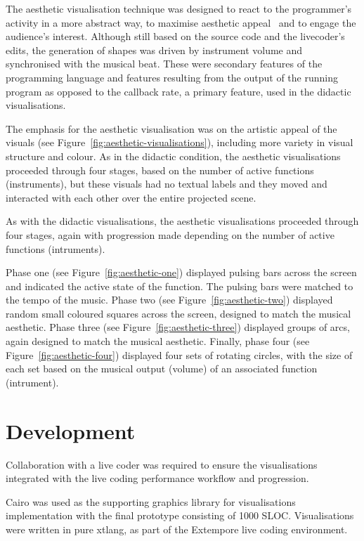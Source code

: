 

The aesthetic visualisation technique was designed to react to the programmer's activity in a more abstract way, to maximise aesthetic appeal~\cite{Cawthon2007} and to engage the audience's interest. Although still based on the source code and the livecoder's edits, the generation of shapes was driven by instrument volume and synchronised with the musical beat. These were secondary features of the programming language and features resulting from the output of the running program as opposed to the callback rate, a primary feature, used in the didactic visualisations.

The emphasis for the aesthetic visualisation was on the artistic appeal of the visuals (see Figure~\ref{fig:aesthetic-visualisations}), including more variety in visual structure and colour. As in the didactic condition, the aesthetic visualisations proceeded through four stages, based on the number of active functions (instruments), but these visuals had no textual labels and they moved and interacted with each other over the entire projected scene.

As with the didactic visualisations, the aesthetic visualisations proceeded through four stages, again with progression made depending on the number of active functions (intruments).

Phase one (see Figure~\ref{fig:aesthetic-one}) displayed pulsing bars across the screen and indicated the active state of the function. The pulsing bars were matched to the tempo of the music. Phase two (see Figure~\ref{fig:aesthetic-two}) displayed random small coloured squares across the screen, designed to match the musical aesthetic. Phase three (see Figure~\ref{fig:aesthetic-three}) displayed groups of arcs, again designed to match the musical aesthetic. Finally, phase four (see Figure~\ref{fig:aesthetic-four}) displayed four sets of rotating circles, with the size of each set based on the musical output (volume) of an associated function (intrument).

\section{Development}

Collaboration with a live coder was required to ensure the visualisations integrated with the live coding performance workflow and progression.

Cairo was used as the supporting graphics library for visualisations implementation with the final prototype consisting of 1000 \ac{SLOC}. Visualisations were written in pure xtlang, as part of the Extempore live coding environment.

